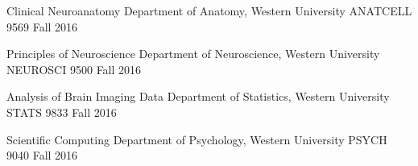 \begin{cvhonors}
 \cvhonor
    {Clinical Neuroanatomy} %
    {Department of Anatomy, Western University}
    {ANATCELL 9569}
  	{Fall 2016}
  	
 \cvhonor
    {Principles of Neuroscience} %
    {Department of Neuroscience, Western University}
    {NEUROSCI 9500}
  	{Fall 2016}
  	
 \cvhonor
    {Analysis of Brain Imaging Data} %
    {Department of Statistics, Western University}
    {STATS 9833}
  	{Fall 2016}
  	
 \cvhonor
    {Scientific Computing} %
    {Department of Psychology, Western University}
    {PSYCH 9040}
  	{Fall 2016}
  	
\end{cvhonors}